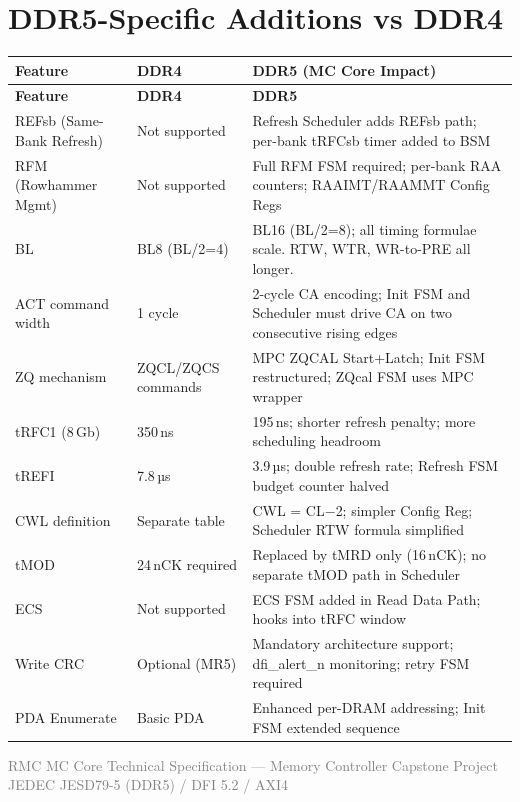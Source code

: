 \documentclass[11pt,a4paper]{article}
\begin{document}
\section{DDR5-Specific Additions vs DDR4}

\begin{longtable}{L{3.2cm} L{4.5cm} L{7cm}}
\toprule
\textbf{Feature} & \textbf{DDR4} & \textbf{DDR5 (MC Core Impact)} \\
\midrule
\endfirsthead\toprule\textbf{Feature}&\textbf{DDR4}&\textbf{DDR5}\\\midrule\endhead\bottomrule\endfoot
{}
REFsb (Same-Bank Refresh) & Not supported & Refresh Scheduler adds REFsb path; per-bank tRFCsb timer added to BSM \\
RFM (Rowhammer Mgmt) & Not supported & Full RFM FSM required; per-bank RAA counters; RAAIMT/RAAMMT Config Regs \\
BL & BL8 (BL/2=4) & BL16 (BL/2=8); all timing formulae scale. RTW, WTR, WR-to-PRE all longer. \\
ACT command width & 1 cycle & 2-cycle CA encoding; Init FSM and Scheduler must drive CA on two consecutive rising edges \\
ZQ mechanism & ZQCL/ZQCS commands & MPC ZQCAL Start+Latch; Init FSM restructured; ZQcal FSM uses MPC wrapper \\
tRFC1 (8\,Gb) & 350\,ns & 195\,ns; shorter refresh penalty; more scheduling headroom \\
tREFI & 7.8\,µs & 3.9\,µs; double refresh rate; Refresh FSM budget counter halved \\
CWL definition & Separate table & CWL = CL$-$2; simpler Config Reg; Scheduler RTW formula simplified \\
tMOD & 24\,nCK required & Replaced by tMRD only (16\,nCK); no separate tMOD path in Scheduler \\
ECS & Not supported & ECS FSM added in Read Data Path; hooks into tRFC window \\
Write CRC & Optional (MR5) & Mandatory architecture support; dfi\_alert\_n monitoring; retry FSM required \\
PDA Enumerate & Basic PDA & Enhanced per-DRAM addressing; Init FSM extended sequence \\
\end{longtable}

\vfill
\begin{center}
\small\textcolor{gray}{%
RMC MC Core Technical Specification ---
Memory Controller Capstone Project\\
JEDEC JESD79-5 (DDR5) / DFI 5.2 / AXI4
}
\end{center}
\end{document}
